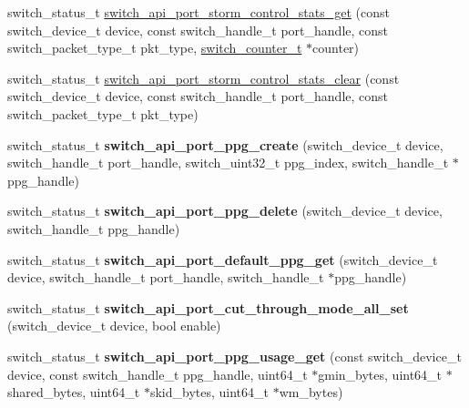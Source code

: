 \begin{DoxyCompactItemize}
\item 
switch\+\_\+status\+\_\+t \hyperlink{group__Port_gaa7c91f0dccbc504c3b0ac8a48dcabf7f}{switch\+\_\+api\+\_\+port\+\_\+storm\+\_\+control\+\_\+stats\+\_\+get} (const switch\+\_\+device\+\_\+t device, const switch\+\_\+handle\+\_\+t port\+\_\+handle, const switch\+\_\+packet\+\_\+type\+\_\+t pkt\+\_\+type, \hyperlink{structswitch__counter__s}{switch\+\_\+counter\+\_\+t} $\ast$counter)
\item 
switch\+\_\+status\+\_\+t \hyperlink{group__Port_ga3275987949631b3be504b7a063922497}{switch\+\_\+api\+\_\+port\+\_\+storm\+\_\+control\+\_\+stats\+\_\+clear} (const switch\+\_\+device\+\_\+t device, const switch\+\_\+handle\+\_\+t port\+\_\+handle, const switch\+\_\+packet\+\_\+type\+\_\+t pkt\+\_\+type)
\item 
\hypertarget{group__Port_gaf4d8dff7ce1eb5453662093c2fd602c0}{switch\+\_\+status\+\_\+t {\bfseries switch\+\_\+api\+\_\+port\+\_\+ppg\+\_\+create} (switch\+\_\+device\+\_\+t device, switch\+\_\+handle\+\_\+t port\+\_\+handle, switch\+\_\+uint32\+\_\+t ppg\+\_\+index, switch\+\_\+handle\+\_\+t $\ast$ppg\+\_\+handle)}\label{group__Port_gaf4d8dff7ce1eb5453662093c2fd602c0}

\item 
\hypertarget{group__Port_gaf189d2b67804efdbed32989dd8120a66}{switch\+\_\+status\+\_\+t {\bfseries switch\+\_\+api\+\_\+port\+\_\+ppg\+\_\+delete} (switch\+\_\+device\+\_\+t device, switch\+\_\+handle\+\_\+t ppg\+\_\+handle)}\label{group__Port_gaf189d2b67804efdbed32989dd8120a66}

\item 
\hypertarget{group__Port_gac0c41ccce00e76d17b53afafa006046e}{switch\+\_\+status\+\_\+t {\bfseries switch\+\_\+api\+\_\+port\+\_\+default\+\_\+ppg\+\_\+get} (switch\+\_\+device\+\_\+t device, switch\+\_\+handle\+\_\+t port\+\_\+handle, switch\+\_\+handle\+\_\+t $\ast$ppg\+\_\+handle)}\label{group__Port_gac0c41ccce00e76d17b53afafa006046e}

\item 
\hypertarget{group__Port_gab557635405c18abb2024183cf339aa23}{switch\+\_\+status\+\_\+t {\bfseries switch\+\_\+api\+\_\+port\+\_\+cut\+\_\+through\+\_\+mode\+\_\+all\+\_\+set} (switch\+\_\+device\+\_\+t device, bool enable)}\label{group__Port_gab557635405c18abb2024183cf339aa23}

\item 
\hypertarget{group__Port_gaec5fdebcf11f1414fae10d1b1ec73c1e}{switch\+\_\+status\+\_\+t {\bfseries switch\+\_\+api\+\_\+port\+\_\+ppg\+\_\+usage\+\_\+get} (const switch\+\_\+device\+\_\+t device, const switch\+\_\+handle\+\_\+t ppg\+\_\+handle, uint64\+\_\+t $\ast$gmin\+\_\+bytes, uint64\+\_\+t $\ast$shared\+\_\+bytes, uint64\+\_\+t $\ast$skid\+\_\+bytes, uint64\+\_\+t $\ast$wm\+\_\+bytes)}\label{group__Port_gaec5fdebcf11f1414fae10d1b1ec73c1e}


\end{DoxyCompactItemize}

